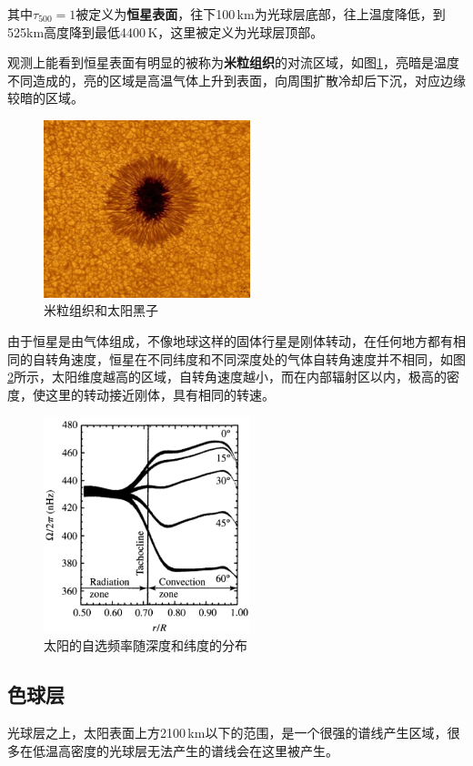 其中$\tau_{500}=1$被定义为\textbf{恒星表面}，往下100\,km为光球层底部，往上温度降低，到525km高度降到最低4400\,K，这里被定义为光球层顶部。

观测上能看到恒星表面有明显的被称为\textbf{米粒组织}的对流区域，如图\ref{fig:cell}，亮暗是温度不同造成的，亮的区域是高温气体上升到表面，向周围扩散冷却后下沉，对应边缘较暗的区域。

\begin{figure}[hbt]
  \centering
  \includegraphics[width=6cm]{chapters/11/cell}
  \caption{米粒组织和太阳黑子}
  \label{fig:cell}
\end{figure}

由于恒星是由气体组成，不像地球这样的固体行星是刚体转动，在任何地方都有相同的自转角速度，恒星在不同纬度和不同深度处的气体自转角速度并不相同，如图\ref{fig:rotaion}所示，太阳维度越高的区域，自转角速度越小，而在内部辐射区以内，极高的密度，使这里的转动接近刚体，具有相同的转速。

\begin{figure}[hbt]
  \centering
  \includegraphics[width=6cm]{chapters/11/rotation}
  \caption{太阳的自选频率随深度和纬度的分布}
  \label{fig:rotaion}
\end{figure}



\subsection{色球层}
光球层之上，太阳表面上方2100\,km以下的范围，是一个很强的谱线产生区域，很多在低温高密度的光球层无法产生的谱线会在这里被产生。

